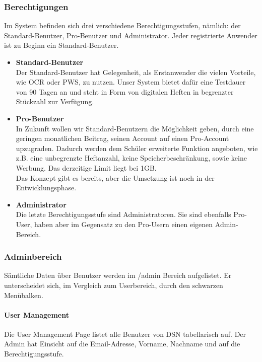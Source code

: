 \subsubsection{Berechtigungen}
Im System befinden sich drei verschiedene Berechtigungsstufen, nämlich: der Standard-Benutzer, Pro-Benutzer und Administrator. Jeder registrierte Anwender ist zu Beginn ein Standard-Benutzer.\\

\begin{itemize}
\item \textbf{Standard-Benutzer}\\ Der Standard-Benutzer hat Gelegenheit, als Erstanwender die vielen Vorteile, wie OCR oder PWS, zu nutzen. Unser System bietet dafür eine Testdauer von 90 Tagen an und steht in Form von digitalen Heften in begrenzter Stückzahl zur Verfügung.
\item \textbf{Pro-Benutzer}\\ In Zukunft wollen wir Standard-Benutzern die Möglichkeit geben, durch eine geringen monatlichen Beitrag, seinen Account auf einen Pro-Account upzugraden. Dadurch werden dem Schüler erweiterte Funktion angeboten, wie z.B. eine unbegrenzte Heftanzahl, keine Speicherbeschränkung, sowie keine Werbung. Das derzeitige Limit liegt bei 1GB.\\
Das Konzept gibt es bereits, aber die Umsetzung ist noch in der Entwicklungsphase.
\item \textbf{Administrator}\\ Die letzte Berechtigungsstufe sind Administratoren. Sie sind ebenfalls Pro-User, haben aber im Gegensatz zu den Pro-Usern einen eigenen Admin-Bereich.
\end{itemize}

\subsubsection{Adminbereich}
Sämtliche Daten über Benutzer werden im /admin Bereich aufgelistet. Er unterscheidet sich, im Vergleich zum Userbereich, durch den schwarzen Menübalken.
\paragraph{User Management}
Die User Management Page listet alle Benutzer von DSN tabellarisch auf. Der Admin hat Einsicht auf die Email-Adresse, Vorname, Nachname und auf die Berechtigungsstufe.

